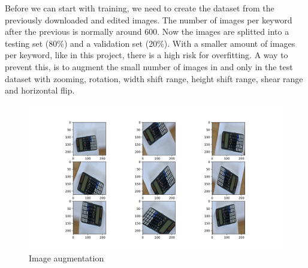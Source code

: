 \documentclass[../ImageClassifier.tex]{subfiles}
\begin{document}
    Before we can start with training, we need to create the dataset from the previously downloaded and edited images.
    The number of images per keyword after the previous is normally around 600.
    Now the images are splitted into a testing set (80\%) and a validation set (20\%).
    With a smaller amount of images per keyword, like in this project, there is a high risk for overfitting.
    A way to prevent this, is to augment the small number of images in and only in the test dataset with zooming, rotation, width shift range, height shift range, shear range and horizontal flip.
    \begin{figure}[H]
        \includegraphics[width=\textwidth,height=\textheight,keepaspectratio]{./attachments/augmentation/augmentation.jpg}
        \caption{Image augmentation}
        \label{fig:image augmentation}
    \end{figure}
\end{document}
